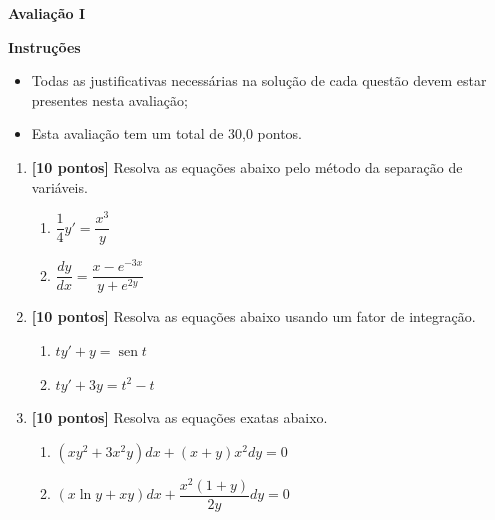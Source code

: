 \documentclass[12pt,a4paper]{article}
\DeclareMathOperator{\sen}{sen}
\begin{document}
\begin{center}
 \textbf{Avaliação I}
\end{center}

\textbf{Instruções}
\begin{itemize}
 \item Todas as justificativas necessárias na solução de cada questão devem 
 estar presentes nesta avaliação;
 \item Esta avaliação tem um total de 30,0 pontos.
\end{itemize}

\begin{enumerate}
  \item \textbf{[10 pontos]} Resolva as equações abaixo pelo método da separação de variáveis.

  \begin{enumerate}
    \item $\dfrac{1}{4}y' = \dfrac{x^3}{y}$
    \item $\dfrac{dy}{dx} = \dfrac{x - e^{-3x}}{y + e^{2y}}$
  \end{enumerate}

  \item \textbf{[10 pontos]} Resolva as equações abaixo usando um fator de integração.

  \begin{enumerate}
    \item $ty' + y = \sen t$
    \item $ty'+ 3y = t^2 - t$
  \end{enumerate}

  \item \textbf{[10 pontos]} Resolva as equações exatas abaixo.

  \begin{enumerate}
    \item $\left(xy^2 + 3x^2y\right)dx + \left(x + y\right)x^2 dy = 0$
    \item $(x\ln y + xy)dx + \dfrac{x^2(1 + y)}{2y}dy = 0$
  \end{enumerate}
  
\end{enumerate}
\end{document}
